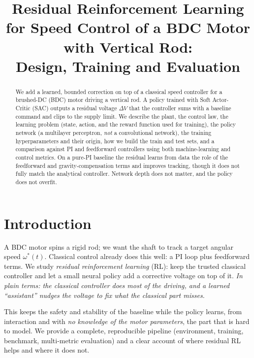 \documentclass[10pt,twocolumn]{article}
\title{\textbf{Residual Reinforcement Learning for Speed Control of a
BDC Motor with Vertical Rod:\\ Design, Training and Evaluation}}
\author{}
\date{}
\newcommand{\eli}[1]{\textit{In plain terms: #1}}
\begin{document}
\maketitle
\thispagestyle{empty}

\begin{abstract}
\small
We add a learned, bounded correction on top of a classical speed
controller for a brushed-DC (BDC) motor driving a vertical rod. A
policy trained with Soft Actor-Critic (SAC) outputs a residual voltage
$\Delta V$ that the controller sums with a baseline command and clips to
the supply limit. We describe the plant, the control law, the learning
problem (state, action, and the reward function used for training), the
policy network (a multilayer perceptron, \emph{not} a convolutional
network), the training hyperparameters and their origin, how we build
the train and test sets, and a comparison against PI and feedforward
controllers using both machine-learning and control metrics. On a
pure-PI baseline the residual learns from data the role of the
feedforward and gravity-compensation terms and improves tracking, though
it does not fully match the analytical controller. Network depth does
not matter, and the policy does not overfit.
\end{abstract}

\section{Introduction}
A BDC motor spins a rigid rod; we want the shaft to track a target
angular speed $\omega^\ast(t)$. Classical control already does this
well: a PI loop plus feedforward terms. We study \emph{residual
reinforcement learning} (RL): keep the trusted classical controller and
let a small neural policy add a corrective voltage on top of it.
\eli{the classical controller does most of the driving, and a learned
``assistant'' nudges the voltage to fix what the classical part misses.}

This keeps the safety and stability of the baseline while the policy
learns, from interaction and with \emph{no knowledge of the motor
parameters}, the part that is hard to model. We provide a complete,
reproducible pipeline (environment, training, benchmark, multi-metric
evaluation) and a clear account of where residual RL helps and where it
does not.

\end{document}
